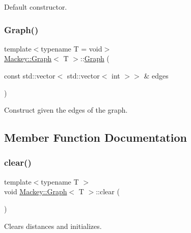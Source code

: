 Default constructor. 

\mbox{\label{classMackey_1_1Graph_a4f0ca7cec28645835bbad29b8c00992c}} 
\subsubsection{\texorpdfstring{Graph()}{Graph()}\hspace{0.1cm}{\footnotesize\ttfamily [2/2]}}
{\footnotesize\ttfamily template$<$typename T = void$>$ \\
\hyperlink{classMackey_1_1Graph}{Mackey\+::\+Graph}$<$ T $>$\+::\hyperlink{classMackey_1_1Graph}{Graph} (\begin{DoxyParamCaption}\item[{const std\+::vector$<$ std\+::vector$<$ int $>$$>$ \&}]{edges }\end{DoxyParamCaption})\hspace{0.3cm}{\ttfamily [inline]}}



Construct given the edges of the graph. 



\subsection{Member Function Documentation}
\mbox{\label{classMackey_1_1Graph_a69d21bdddbb76aa562aa9f60a84c4b10}} 
\subsubsection{\texorpdfstring{clear()}{clear()}}
{\footnotesize\ttfamily template$<$typename T $>$ \\
void \hyperlink{classMackey_1_1Graph}{Mackey\+::\+Graph}$<$ T $>$\+::clear (\begin{DoxyParamCaption}{ }\end{DoxyParamCaption})}



Clears distances and initializes. 

